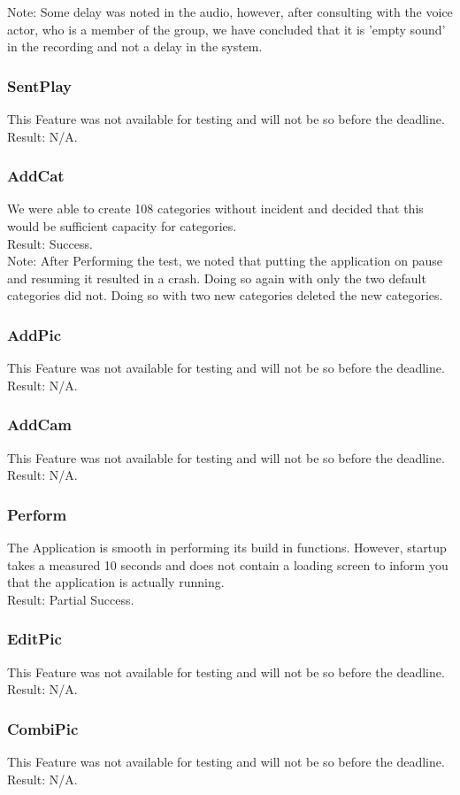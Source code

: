 Note: Some delay was noted in the audio, however, after consulting with the voice actor, who is a member of the group, we have concluded that it is 'empty sound' in the recording and not a delay in the system.

\subsubsection*{SentPlay}
This Feature was not available for testing and will not be so before the deadline.\\

Result: N/A.

\subsubsection*{AddCat}
We were able to create 108 categories without incident and decided that this would be sufficient capacity for categories.\\

Result: Success.\\

Note: After Performing the test, we noted that putting the application on pause and resuming it resulted in a crash. Doing so again with only the two default categories did not. Doing so with two new categories deleted the new categories.

\subsubsection*{AddPic}
This Feature was not available for testing and will not be so before the deadline.\\

Result: N/A.

\subsubsection*{AddCam}
This Feature was not available for testing and will not be so before the deadline.\\

Result: N/A.

\subsubsection*{Perform}
The Application is smooth in performing its build in functions.
However, startup takes a measured  10 seconds and does not contain a loading screen to inform you that the application is actually running.\\

Result: Partial Success.

\subsubsection*{EditPic}
This Feature was not available for testing and will not be so before the deadline.\\

Result: N/A.

\subsubsection*{CombiPic}
This Feature was not available for testing and will not be so before the deadline.\\

Result: N/A.